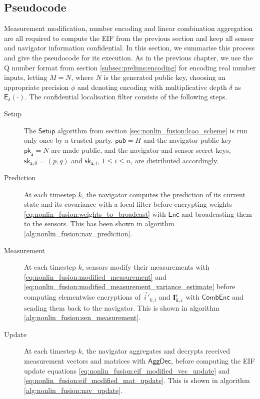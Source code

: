 \subsection{Pseudocode}\label{subsec:nonlin_fusion:pseudocode}
Measurement modification, number encoding and linear combination aggregation are all required to compute the EIF from the previous section and keep all sensor and navigator information confidential. In this section, we summarise this process and give the pseudocode for its execution. As in the previous chapter, we use the  Q number format from section \ref{subsec:prelims:encoding} for encoding real number inputs, letting $M=N$, where $N$ is the generated public key, choosing an appropriate precision $\phi$ and denoting encoding with multiplicative depth $\delta$ as $\mathsf{E}_{\delta}(\cdot)$. The confidential localisation filter consists of the following steps.
\begin{description}
    \item[Setup] The $\mathsf{Setup}$ algorithm from section \ref{sec:nonlin_fusion:lcao_scheme} is run only once by a trusted party. $\mathsf{pub}=H$ and the navigator public key $\mathsf{pk}_{\mathsf{a}}=N$ are made public, and the navigator and sensor secret keys, $\mathsf{sk}_{\mathsf{a},0}=(p, q)$ and $\mathsf{sk}_{\mathsf{a}, i}$, $1\leq i\leq n$, are distributed accordingly.

    \item[Prediction] At each timestep $k$, the navigator computes the prediction of its current state and its covariance with a local filter before encrypting weights \eqref{eq:nonlin_fusion:weights_to_broadcast} with $\mathsf{Enc}$ and broadcasting them to the sensors. This has been shown in algorithm \ref{alg:nonlin_fusion:nav_prediction}.

    \item[Measurement] At each timestep $k$, sensors modify their measurements with \eqref{eq:nonlin_fusion:modified_measurement} and \eqref{eq:nonlin_fusion:modified_measurement_variance_estimate} before computing elementwise encryptions of $\vec{i}'_{k, i}$ and ${{\mathbf{I}}}'_{k, i}$ with $\mathsf{CombEnc}$ and sending them back to the navigator. This is shown in algorithm \ref{alg:nonlin_fusion:sen_measurement}.

    \item[Update] At each timestep $k$, the navigator aggregates and decrypts received measurement vectors and matrices with $\mathsf{AggDec}$, before computing the EIF update equations \eqref{eq:nonlin_fusion:eif_modified_vec_update} and \eqref{eq:nonlin_fusion:eif_modified_mat_update}. This is shown in algorithm \ref{alg:nonlin_fusion:nav_update}.
\end{description}

